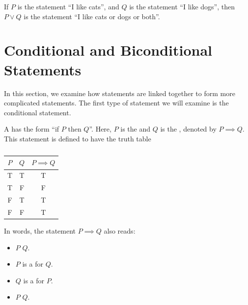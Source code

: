 \begin{example}[Disjunction]
    If $P$ is the statement ``I like cats'', and $Q$ is the statement ``I like dogs'', then $P \lor Q$ is the statement ``I like cats or dogs or both''.
\end{example}

\section{Conditional and Biconditional Statements}

In this section, we examine how statements are linked together to form more complicated statements. The first type of statement we will examine is the conditional statement.

\begin{definition}
    A  has the form ``if $P$ then $Q$''. Here, $P$ is the  and $Q$ is the , denoted by $P \implies Q$. This statement is defined to have the truth table
    \begin{table}[H]
        \centering
        \begin{tabular}{|c|c|c|}
        \hline
        $P$ & $Q$ & $P \implies Q$ \\ \hline\hline
        T & T & T \\ \hline
        T & F & F \\ \hline
        F & T & T \\ \hline
        F & F & T \\ \hline
        \end{tabular}
        \caption{}
    \end{table}
    In words, the statement $P \implies Q$ also reads:
    \begin{itemize}
        \item $P$  $Q$.
        \item $P$ is a  for $Q$.
        \item $Q$ is a  for $P$.
        \item $P$  $Q$.
    \end{itemize}
\end{definition}

